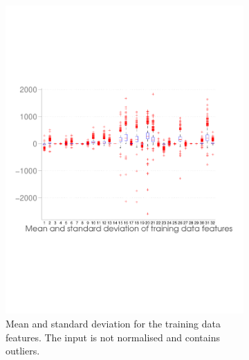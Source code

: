 \begin{figure}[h]
	\begin{subfigure}[b]{0.5\textwidth}
   \includegraphics[width=\textwidth]{figures/classification_distribution.pdf}
    \caption{Mean and standard deviation for the training data features. The input is not normalised and contains outliers.}
    \label{fig:dist_classification}
  \end{subfigure}
  \hfill
  \begin{subfigure}[b]{0.45\textwidth}

\end{subfigure}
\end{figure}
